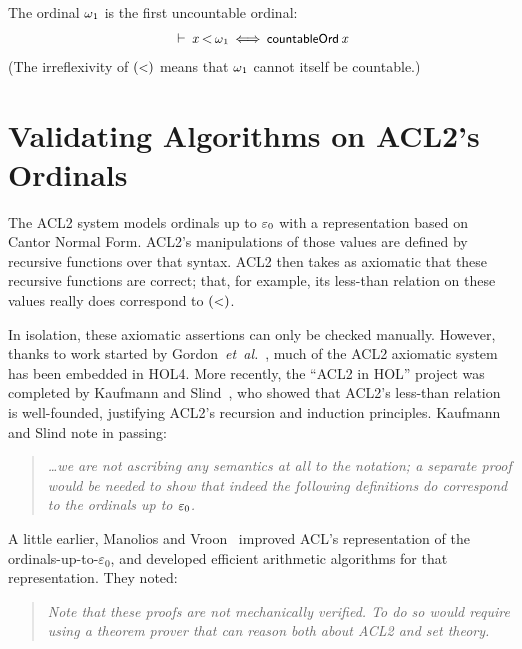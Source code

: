 \documentclass[11pt]{llncs}
\renewcommand{\HOLConst}[1]{{\textsf{\upshape\small #1}}}
\renewcommand{\HOLinline}[1]{\ensuremath{#1}}
\newenvironment{holmath}{\begin{displaymath}\begin{array}{l}}{\end{array}\end{displaymath}\ignorespacesafterend}
\begin{document}
\begin{theorem}
The ordinal \HOLinline{\HOLConst{\ensuremath{\omega}\ensuremath{\sb{1}}}} is the first uncountable ordinal:
\begin{holmath}
\HOLTokenTurnstile{}\,\HOLFreeVar{x}\,\ensuremath{{<}}\,\HOLConst{\ensuremath{\omega}\ensuremath{\sb{1}}}\,\ensuremath{{\iff}}\,\HOLConst{countableOrd}\,\HOLFreeVar{x}
\end{holmath}
(The irreflexivity of \HOLinline{(\HOLConst{\ensuremath{{<}}})} means that \HOLinline{\HOLConst{\ensuremath{\omega}\ensuremath{\sb{1}}}} cannot itself be countable.)
\end{theorem}

\section{Validating Algorithms on ACL2's Ordinals}
\label{sec:validating-acl2}

The ACL2 system models ordinals up to \HOLinline{\HOLConst{\ensuremath{\varepsilon_0}}} with a representation based on Cantor Normal Form.
ACL2's manipulations of those values are defined by recursive functions over that syntax.
ACL2 then takes as axiomatic that these recursive functions are correct; that, for example, its less-than relation on these values really does correspond to \HOLinline{(\HOLConst{\ensuremath{{<}}})}.

In isolation, these axiomatic assertions can only be checked manually.
However, thanks to work started by Gordon~\emph{et~al.}~\cite{DBLP:conf/fmcad/GordonRHK06}, much of the ACL2 axiomatic system has been embedded in HOL4.
More recently, the ``ACL2 in HOL'' project was completed by Kaufmann and Slind~\cite{KaufmannSlind:tphols09:ordinal-pearl}, who showed that ACL2's less-than relation is well-founded, justifying ACL2's recursion and induction principles.
Kaufmann and Slind note in passing:
\begin{quote}\itshape
\dots{}we are not ascribing any semantics at all to the notation; a separate proof would be needed to show that indeed the following definitions do correspond to the ordinals up to \HOLinline{\HOLConst{\ensuremath{\varepsilon_0}}}.
\end{quote}
A little earlier, Manolios and Vroon~\cite{ManoliosVroon:JAR2006:ordinal-arithmetic} improved ACL's representation of the ordinals-up-to-$\varepsilon_0$, and developed efficient arithmetic algorithms for that representation.
They noted:
\begin{quote}\itshape
Note that these proofs are not mechanically verified.
To do so would require using a theorem prover that can reason both about ACL2 and set theory.
\end{quote}
\end{document}
